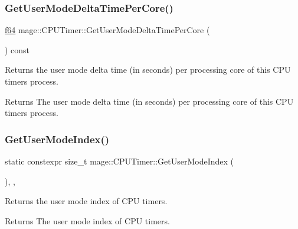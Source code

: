 \subsubsection{\texorpdfstring{Get\+User\+Mode\+Delta\+Time\+Per\+Core()}{GetUserModeDeltaTimePerCore()}}
{\footnotesize\ttfamily \hyperlink{namespacemage_ab935747c6941320bd6214b5a5f265b09}{f64} mage\+::\+C\+P\+U\+Timer\+::\+Get\+User\+Mode\+Delta\+Time\+Per\+Core (\begin{DoxyParamCaption}{ }\end{DoxyParamCaption}) const\hspace{0.3cm}{\ttfamily [noexcept]}}

Returns the user mode delta time (in seconds) per processing core of this C\+PU timer\textquotesingle{}s process.

\begin{DoxyReturn}{Returns}
The user mode delta time (in seconds) per processing core of this C\+PU timer\textquotesingle{}s process. 
\end{DoxyReturn}
\hypertarget{classmage_1_1_c_p_u_timer_a457d65db3cb67775971e2750755ad403}{}\label{classmage_1_1_c_p_u_timer_a457d65db3cb67775971e2750755ad403} 
\subsubsection{\texorpdfstring{Get\+User\+Mode\+Index()}{GetUserModeIndex()}}
{\footnotesize\ttfamily static constexpr size\+\_\+t mage\+::\+C\+P\+U\+Timer\+::\+Get\+User\+Mode\+Index (\begin{DoxyParamCaption}{ }\end{DoxyParamCaption})\hspace{0.3cm}{\ttfamily [static]}, {\ttfamily [private]}, {\ttfamily [noexcept]}}

Returns the user mode index of C\+PU timers.

\begin{DoxyReturn}{Returns}
The user mode index of C\+PU timers. 
\end{DoxyReturn}
\hypertarget{classmage_1_1_c_p_u_timer_aa453ec0f437762bff5c33ea344329d10}{}\label{classmage_1_1_c_p_u_timer_aa453ec0f437762bff5c33ea344329d10} 
